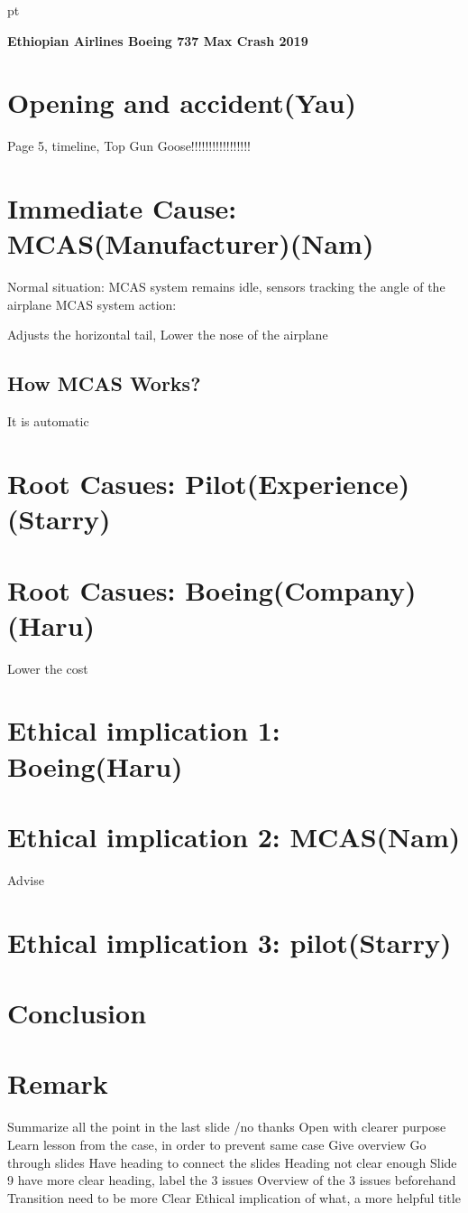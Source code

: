 \documentclass[12pt]{report}
\begin{document}
 pt
\begin{center}
{\bf \LARGE Ethiopian Airlines Boeing 737 Max Crash 2019}
\end{center}
\vspace{0.3cm}
\section{Opening and accident(Yau)}
Page 5, timeline, Top Gun Goose!!!!!!!!!!!!!!!!!
\section{Immediate Cause: MCAS(Manufacturer)(Nam)}
Normal situation: MCAS system remains idle, sensors tracking the angle of the airplane
MCAS system
action:

Adjusts the horizontal tail,
Lower the nose of the airplane
\subsection{How MCAS Works?}
It is automatic 
\section{Root Casues: Pilot(Experience)(Starry)}

\section{Root Casues: Boeing(Company)(Haru)}
Lower the cost

\section{Ethical implication 1: Boeing(Haru)}
\section{Ethical implication 2: MCAS(Nam)}
Advise
\section{Ethical implication 3: pilot(Starry)}
\section{Conclusion}



\section{Remark}
Summarize all the point in the last slide /no thanks 
Open with clearer purpose 
Learn lesson from the case, in order to prevent same case
Give overview 
Go through slides 
Have heading to connect the slides 
Heading not clear enough 
Slide 9 have more clear heading, label the 3 issues 
Overview of the 3 issues beforehand 
Transition need to be more Clear 
Ethical implication of what, a more helpful title 
\end{document}
